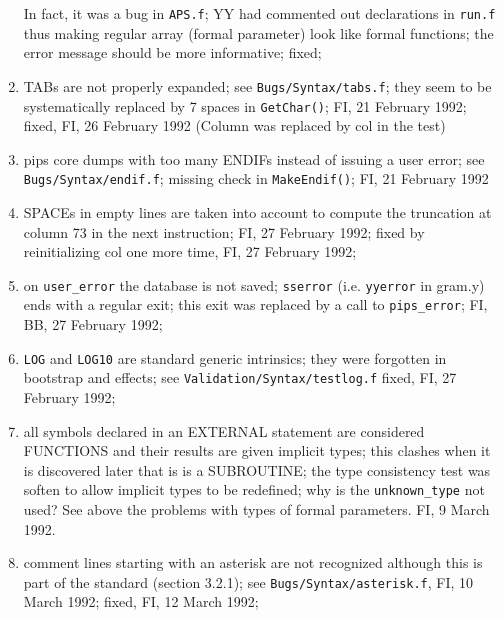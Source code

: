 \begin{enumerate}
        In fact, it was a bug in \verb+APS.f+; 
        YY had commented out declarations in \verb+run.f+ thus making regular
        array (formal parameter) look like formal functions; the error
        message should be more informative; fixed;

  \item TABs are not properly expanded; see \verb+Bugs/Syntax/tabs.f+;
        they seem to be systematically replaced by 7 spaces 
        in \verb+GetChar()+; FI, 21 February 1992; fixed, FI, 26
        February 1992 (Column was replaced by col in the test)

  \item pips core dumps with too many ENDIFs instead of issuing a user
        error; see \verb+Bugs/Syntax/endif.f+; missing check in
        \verb+MakeEndif()+; FI, 21 February 1992

  \item SPACEs in empty lines are taken into account to compute the
        truncation at column 73 in the next instruction; FI, 27 February
        1992; fixed by reinitializing col one more time, FI, 27 February 1992;

  \item on \verb+user_error+ the database is not saved; \verb+sserror+
        (i.e. \verb+yyerror+ in gram.y) ends with a regular exit;
        this exit was replaced by a call to \verb+pips_error+; FI, BB,
        27 February 1992;

  \item \verb+LOG+ and \verb+LOG10+ are standard generic intrinsics;
        they were forgotten in bootstrap and effects; 
        see \verb+Validation/Syntax/testlog.f+
        fixed, FI, 27 February 1992;

  \item all symbols declared in an EXTERNAL statement are considered
        FUNCTIONS and their results are given implicit types;
        this clashes when it is discovered later that is is a SUBROUTINE;
        the type consistency test was soften to allow implicit types
        to be redefined; why is the \verb+unknown_type+ not used? See
        above the problems with types of formal parameters. FI, 9 March 1992.

  \item comment lines starting with an asterisk are not recognized
        although this is part of the standard (section 3.2.1);
        see \verb+Bugs/Syntax/asterisk.f+, FI, 10 March 1992;
        fixed, FI, 12 March 1992;


\end{enumerate}
